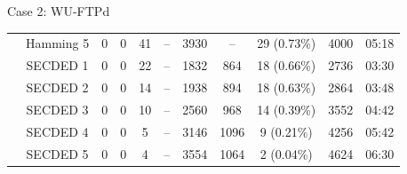 \begin{frame}[noframenumbering]{Case 2: WU-FTPd}
\begin{table}[H]
\begin{tabular}{@{}ccccccccccc@{}}
                                                               & Hamming 5 & 0     & 0      & 41    & --        & 3930                                     & --                                      & 29 {\tiny (0.73\%)}                           & 4000        & 05:18                           \\
                                                               & SECDED 1       & 0     & 0      & 22    & --        & 1832                                     & 864                                     & 18 {\tiny (0.66\%)}                           & 2736        & 03:30                           \\
                                                               & SECDED 2       & 0     & 0      & 14    & --        & 1938                                     & 894                                     & 18 {\tiny (0.63\%)}                           & 2864        & 03:48                           \\
                                                               & SECDED 3       & 0     & 0      & 10    & --        & 2560                                     & 968                                     & 14 {\tiny (0.39\%)}                           & 3552        & 04:42                           \\
                                                               & SECDED 4       & 0     & 0      & 5     & --        & 3146                                     & 1096                                    & 9  {\tiny (0.21\%)}                           & 4256        & 05:42                           \\
                                                               & SECDED 5       & 0     & 0      & 4     & --        & 3554                                     & 1064                                    & 2  {\tiny (0.04\%)}                           & 4624        & 06:30                           \\
            \bottomrule
        \end{tabular}
    \end{table}
\end{frame}

